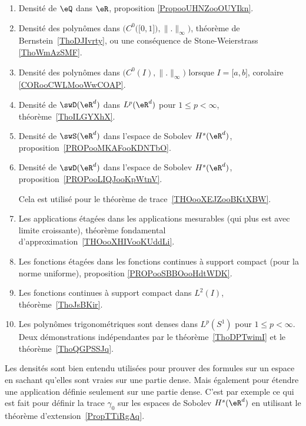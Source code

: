          \label{THEooPUIIooLDPUuq}
\begin{enumerate}
	\item
	      Densité de \( \eQ\) dans \( \eR\), proposition \ref{PropooUHNZooOUYIkn}.
	\item
	      Densité des polynômes dans \( \Big( C^0\big( \mathopen[ 0 , 1 \mathclose] \big),\| . \|_{\infty} \Big)\), théorème de Bernstein~\ref{ThoDJIvrty}, ou une conséquence de Stone-Weierstrass \ref{ThoWmAzSMF}.
	\item
	      Densité des polynômes dans \( \big( C^0(I),\| . \|_{\infty} \big)\) lorsque \( I=\mathopen[ a , b \mathclose]\), corolaire \ref{CORooCWLMooWwCOAP}.
	\item
	      Densité de \( \swD(\eR^d)\) dans \( L^p(\eR^d)\) pour \( 1\leq p<\infty\), théorème~\ref{ThoILGYXhX}.
	\item
	      Densité de \( \swS(\eR^d)\) dans l'espace de Sobolev \( H^s(\eR^d)\), proposition~\ref{PROPooMKAFooKDNTbO}.

	\item
	      Densité de \( \swD(\eR^d)\) dans l'espace de Sobolev \( H^s(\eR^d)\), proposition~\ref{PROPooLIQJooKpWtnV}.

	      Cela est utilisé pour le théorème de trace~\ref{THOooXEJZooBKtXBW}.
	\item
	      Les applications étagées dans les applications mesurables (qui plus est avec limite croissante), théorème fondamental d'approximation~\ref{THOooXHIVooKUddLi}.
	\item
	      Les fonctions étagées dans les fonctions continues à support compact (pour la norme uniforme), proposition \ref{PROPooSBBOooHdtWDK}.
	\item
	      Les fonctions continues à support compact dans \( L^2(I)\), théorème~\ref{ThoJsBKir}.
	\item
	      Les polynômes trigonométriques sont denses dans \( L^p(S^1)\) pour \( 1\leq p<\infty\). Deux démonstrations indépendantes par le théorème~\ref{ThoDPTwimI} et le théorème~\ref{ThoQGPSSJq}.
\end{enumerate}
Les densités sont bien entendu utilisées pour prouver des formules sur un espace en sachant qu'elles sont vraies sur une partie dense. Mais également pour étendre une application définie seulement sur une partie dense. C'est par exemple ce qui est fait pour définir la trace \( \gamma_0\) sur les espaces de Sobolev \( H^s(\eR^d)\) en utilisant le théorème d'extension~\ref{PropTTiRgAq}.

